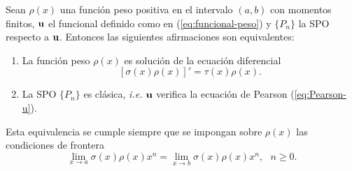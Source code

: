 \begin{lema}
    \label{lema:equivalencia-pearson}
    Sean $\rho(x)$ una función peso positiva en el intervalo $(a,b)$ con momentos finitos, $\mathbf{u}$ el funcional definido como en (\ref{eq:funcional-peso}) y $\{P_n\}$ la SPO respecto a $\mathbf{u}$. Entonces las siguientes afirmaciones son equivalentes: 
    \begin{enumerate}
        \item La función peso $\rho(x)$ es solución de la ecuación diferencial
        \begin{equation}
            \label{eq:Pearson-peso}
            [\sigma(x)\rho(x)]'=\tau(x)\rho(x).
        \end{equation}
        \item La SPO $\{P_n\}$ es clásica, \textit{i.e.} $\mathbf{u}$ verifica la ecuación de Pearson (\ref{eq:Pearson-u}).    
    \end{enumerate}
    Esta equivalencia se cumple siempre que se impongan sobre $\rho(x)$ las condiciones de frontera 
    \begin{equation}
        \label{eq:cond-frontera}
        \displaystyle\lim_{x\rightarrow a}\sigma(x)\rho(x)x^n = \displaystyle\lim_{x\rightarrow b}\sigma(x)\rho(x)x^n, \ \ \ n\geq 0.
    \end{equation}
\end{lema}

